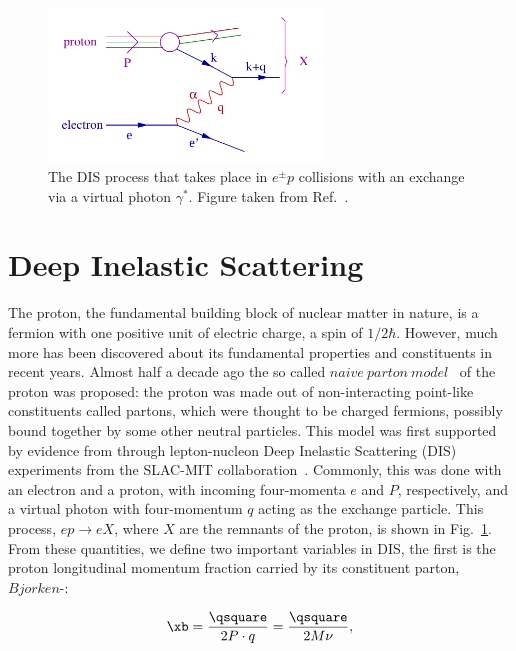 \begin{figure}[hb]
	\centerline{
		\includegraphics[width=0.65\textwidth]{figures/dis_2.pdf} 
	}
	\caption{ The DIS process that takes place in $e^{\pm}p$ collisions with an exchange via a virtual photon $\gamma^{*}$. Figure taken from Ref.~\cite{Iancu:2012xa}. }
	\label{fig:dis}
\end{figure}


\section{Deep Inelastic Scattering}

The proton, the fundamental building block of nuclear matter in nature, is a fermion with one positive unit of electric charge, a spin of $1/2 \hbar$. However, much more has been discovered about its fundamental properties and constituents in recent years. Almost half a decade ago the so called $naive\ parton\ model$~\cite{Bjorken:1969ja,Peskin:1995ev} of the proton was proposed: the proton was made out of non-interacting point-like constituents called partons, which were thought to be charged fermions, possibly bound together by some other neutral particles. This model was first supported by evidence from through lepton-nucleon Deep Inelastic Scattering (DIS) experiments from the SLAC-MIT collaboration~\cite{Whitlow:1990gk}. Commonly, this was done with an electron and a proton, with incoming four-momenta $e$ and $P$, respectively, and a virtual photon with four-momentum $q$ acting as the exchange particle. This process, $ep \rightarrow eX$, where $X$ are the remnants of the proton, is shown in Fig.~\ref{fig:dis}. From these quantities, we define two important variables in DIS, the first is the proton longitudinal momentum fraction carried by its constituent parton, $Bjorken$-\xb:

\begin{equation}
\xb = \frac{\qsquare}{2P\cdot q} = \frac{\qsquare}{2M\nu},
\label{eqn:xb}
\end{equation}


